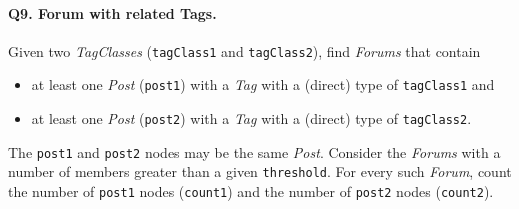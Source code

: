 \paragraph{\textbf{Q9}. Forum with related Tags.}
Given two \emph{TagClasses} (\texttt{tagClass1} and \texttt{tagClass2}),
find \emph{Forums} that contain
\begin{itemize}
\tightlist
\item
  at least one \emph{Post} (\texttt{post1}) with a \emph{Tag} with a
  (direct) type of \texttt{tagClass1} and
\item
  at least one \emph{Post} (\texttt{post2}) with a \emph{Tag} with a
  (direct) type of \texttt{tagClass2}.
\end{itemize}
The \texttt{post1} and \texttt{post2} nodes may be the same \emph{Post}.
Consider the \emph{Forums} with a number of members greater than a given
\texttt{threshold}. For every such \emph{Forum}, count the number of
\texttt{post1} nodes (\texttt{count1}) and the number of \texttt{post2}
nodes (\texttt{count2}).
